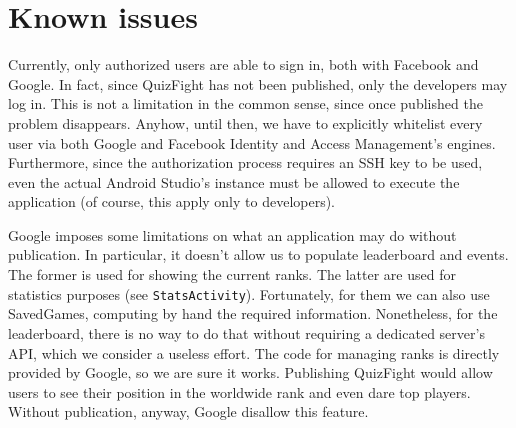 \section{Known issues}\label{sec:issues}
Currently, only authorized users are able to sign in, both with Facebook and
Google. In fact, since QuizFight has not been published, only the developers
may log in. This is not a limitation in the common sense, since once published
the problem disappears. Anyhow, until then, we have to explicitly whitelist
every user via both Google and Facebook Identity and Access Management's engines.
Furthermore, since the authorization process requires an SSH key to be used, even
the actual Android Studio’s instance must be allowed to execute the application
(of course, this apply only to developers).

Google imposes some limitations on what an application may do without
publication. In particular, it doesn't allow us to populate leaderboard and
events. The former is used for showing the current ranks. The latter are used
for statistics purposes (see \texttt{StatsActivity}). Fortunately, for them we
can also use SavedGames, computing by hand the required information. Nonetheless,
for the leaderboard, there is no way to do that without requiring a dedicated
server's API, which we consider a useless effort. The code for managing ranks
is directly provided by Google, so we are sure it works. Publishing QuizFight
would allow users to see their position in the worldwide rank and even dare top
players. Without publication, anyway, Google disallow this feature.
